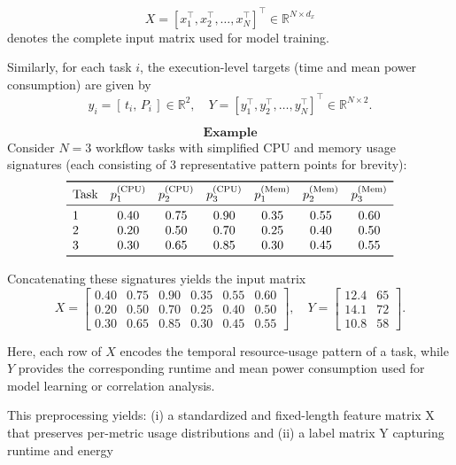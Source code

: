 \[
    X =
    [x_1^\top, x_2^\top, \dots, x_N^\top]^\top
    \in \mathbb{R}^{N \times d_x}
\]
denotes the complete input matrix used for model training.

Similarly, for each task \( i \), the execution-level targets
(time and mean power consumption) are given by
\[
    y_i = [\,t_i,\, P_i\,] \in \mathbb{R}^2,
    \quad
    Y = [y_1^\top, y_2^\top, \dots, y_N^\top]^\top
    \in \mathbb{R}^{N \times 2}.
\]

\[
    \textbf{Example}
\]
Consider \( N = 3 \) workflow tasks with simplified
CPU and memory usage signatures
(each consisting of 3 representative pattern points for brevity):
\[
    \begin{array}{lcccccc}
        \toprule
        \text{Task}        &
        p_1^{(\text{CPU})} & p_2^{(\text{CPU})} & p_3^{(\text{CPU})} &
        p_1^{(\text{Mem})} & p_2^{(\text{Mem})} & p_3^{(\text{Mem})}                             \\
        \midrule
        1                  & 0.40               & 0.75               & 0.90 & 0.35 & 0.55 & 0.60 \\
        2                  & 0.20               & 0.50               & 0.70 & 0.25 & 0.40 & 0.50 \\
        3                  & 0.30               & 0.65               & 0.85 & 0.30 & 0.45 & 0.55 \\
        \bottomrule
    \end{array}
\]

Concatenating these signatures yields the input matrix
\[
    X =
    \begin{bmatrix}
        0.40 & 0.75 & 0.90 & 0.35 & 0.55 & 0.60 \\
        0.20 & 0.50 & 0.70 & 0.25 & 0.40 & 0.50 \\
        0.30 & 0.65 & 0.85 & 0.30 & 0.45 & 0.55
    \end{bmatrix},
    \quad
    Y =
    \begin{bmatrix}
        12.4 & 65 \\
        14.1 & 72 \\
        10.8 & 58
    \end{bmatrix}.
\]

Here, each row of \( X \) encodes the temporal resource-usage pattern
of a task, while \( Y \) provides the corresponding runtime and mean
power consumption used for model learning or correlation analysis.

This preprocessing yields: (i) a standardized and fixed-length feature matrix X that preserves per-metric usage distributions and (ii) a label matrix Y capturing runtime and energy

